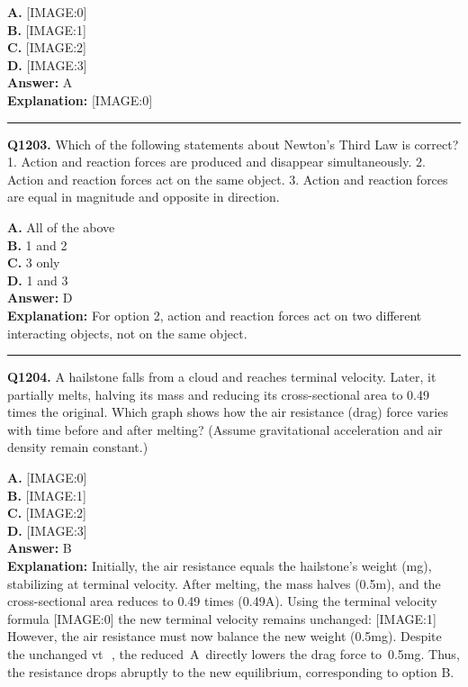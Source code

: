 \documentclass[12pt]{article}
\begin{document}
\textbf{A.} [IMAGE:0] \\
\textbf{B.} [IMAGE:1] \\
\textbf{C.} [IMAGE:2] \\
\textbf{D.} [IMAGE:3] \\

\textbf{Answer:} A \\
\textbf{Explanation:} [IMAGE:0]

\hrule
\vspace{1em}


\noindent
\textbf{Q1203.} Which of the following statements about Newton's Third Law is correct?
1.
Action and reaction forces are produced and disappear simultaneously.
2.
Action and reaction forces act on the same object.
3.
Action and reaction forces are equal in magnitude and opposite in direction.



\textbf{A.} All of the above \\
\textbf{B.} 1 and 2 \\
\textbf{C.} 3 only \\
\textbf{D.} 1 and 3 \\

\textbf{Answer:} D \\
\textbf{Explanation:} For option 2, action and reaction forces act on two different interacting objects, not on the same object.

\hrule
\vspace{1em}


\noindent
\textbf{Q1204.} A hailstone falls from a cloud and reaches terminal velocity. Later, it partially melts, halving its mass and reducing its cross-sectional area to 0.49 times the original. Which graph shows how the air resistance (drag) force varies with time before and after melting? (Assume gravitational acceleration and air density remain constant.)



\textbf{A.} [IMAGE:0] \\
\textbf{B.} [IMAGE:1] \\
\textbf{C.} [IMAGE:2] \\
\textbf{D.} [IMAGE:3] \\

\textbf{Answer:} B \\
\textbf{Explanation:} Initially, the air resistance equals the hailstone’s weight (mg), stabilizing at terminal velocity. After melting, the mass halves (0.5m), and the cross-sectional area reduces to 0.49 times (0.49A). Using the terminal velocity formula
[IMAGE:0]
the new terminal velocity remains unchanged:
[IMAGE:1]
However, the air resistance must now balance the new weight (0.5mg). Despite the unchanged vt
​
, the reduced A directly lowers the drag force to 0.5mg. Thus, the resistance drops abruptly to the new equilibrium, corresponding to option B.
\end{document}
